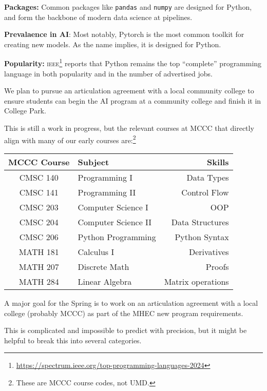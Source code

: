 \textbf{Packages:} Common packages like \texttt{pandas} and \texttt{numpy} are designed for Python, and form the backbone of modern data science at \ai{} pipelines.

\textbf{Prevalaence in AI}: Most notably, Pytorch is the most common toolkit for creating new \ai{} models.  As the name implies, it is designed for Python.  

\textbf{Popularity:} \textsc{ieee}\footnote{\url{https://spectrum.ieee.org/top-programming-languages-2024}} reports that Python remains the top ``complete'' programming language in both popularity and in the number of advertised jobs.


We plan to pursue an articulation agreement with a local community college to ensure students can begin the AI program at a community college and finish it in College Park.

This is still a work in progress, but the relevant courses at MCCC that directly align with many of our early courses are:\footnote{These are MCCC course codes, not UMD.}

\begin{center}
\begin{tabular}{clr}
\toprule
MCCC Course & Subject & Skills \\
\midrule
CMSC 140 & Programming I & Data Types \\
CMSC 141 & Programming II & Control Flow \\
CMSC 203 & Computer Science I & OOP \\
CMSC 204 & Computer Science II & Data Structures \\
CMSC 206 & Python Programming & Python Syntax \\
MATH 181 & Calculus I & Derivatives \\
MATH 207 & Discrete Math & Proofs \\
MATH 284 & Linear Algebra & Matrix operations \\
\bottomrule
\end{tabular}
\end{center}

A major goal for the Spring is to work on an articulation agreement with a local college (probably MCCC) as part of the MHEC new program requirements.


This is complicated and impossible to predict with precision, but it might be helpful to break this into several categories.

